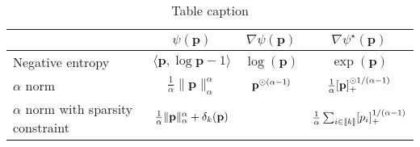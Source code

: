 \begin{table}[h]
  \centering
  \caption{Table caption}
  \label{tab:example}
  \begin{tabular}{lccc}
    \toprule
    & $\psi(\mathbf{p})$ & $\nabla \psi(\mathbf{p})$ & $\nabla \psi^\star(\mathbf{p})$ \\
    \midrule
    Negative entropy & $\langle \mathbf{p}, \log \mathbf{p} - 1 \rangle$ & $\log(\mathbf{p})$ & $\exp(\mathbf{p})$ \\
    $\alpha$ norm & $\frac{1}{\alpha} \| \mathbf{p} \|_{\alpha}^{\alpha}$ & ${\mathbf{p}}^{\odot (\alpha-1)}$ & $\frac{1}{\alpha} [{\mathbf{p}}]_{+}^{\odot 1 / (\alpha-1)}$ \\
    $\alpha$ norm with sparsity constraint & $\frac{1}{\alpha} \| \mathbf{p} \|_{\alpha}^{\alpha} + \delta_{k}({\mathbf{p}})$ & & $\frac{1}{\alpha} \sum_{i \in {[\![k]\!]}} [p_i]_{+}^{1 / (\alpha-1)}$ \\
    \bottomrule
  \end{tabular}
  \vspace{0.5cm}
\end{table}



